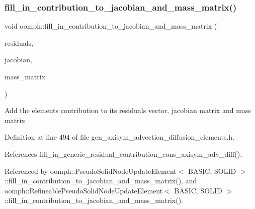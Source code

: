 \mbox{\label{namespaceoomph_a2a572a47ad179fe5efba31f8f0a67244}} 
\subsubsection{\texorpdfstring{fill\+\_\+in\+\_\+contribution\+\_\+to\+\_\+jacobian\+\_\+and\+\_\+mass\+\_\+matrix()}{fill\_in\_contribution\_to\_jacobian\_and\_mass\_matrix()}}
{\footnotesize\ttfamily void oomph\+::fill\+\_\+in\+\_\+contribution\+\_\+to\+\_\+jacobian\+\_\+and\+\_\+mass\+\_\+matrix (\begin{DoxyParamCaption}\item[{\hyperlink{classoomph_1_1Vector}{Vector}$<$ double $>$ \&}]{residuals,  }\item[{\hyperlink{classoomph_1_1DenseMatrix}{Dense\+Matrix}$<$ double $>$ \&}]{jacobian,  }\item[{\hyperlink{classoomph_1_1DenseMatrix}{Dense\+Matrix}$<$ double $>$ \&}]{mass\+\_\+matrix }\end{DoxyParamCaption})}

Add the element\textquotesingle{}s contribution to its residuals vector, jacobian matrix and mass matrix 

Definition at line 494 of file gen\+\_\+axisym\+\_\+advection\+\_\+diffusion\+\_\+elements.\+h.



References fill\+\_\+in\+\_\+generic\+\_\+residual\+\_\+contribution\+\_\+cons\+\_\+axisym\+\_\+adv\+\_\+diff().



Referenced by oomph\+::\+Pseudo\+Solid\+Node\+Update\+Element$<$ B\+A\+S\+I\+C, S\+O\+L\+I\+D $>$\+::fill\+\_\+in\+\_\+contribution\+\_\+to\+\_\+jacobian\+\_\+and\+\_\+mass\+\_\+matrix(), and oomph\+::\+Refineable\+Pseudo\+Solid\+Node\+Update\+Element$<$ B\+A\+S\+I\+C, S\+O\+L\+I\+D $>$\+::fill\+\_\+in\+\_\+contribution\+\_\+to\+\_\+jacobian\+\_\+and\+\_\+mass\+\_\+matrix().

\mbox{\label{namespaceoomph_a4221193ecad909a3bf5cfcec81202e39}} 
